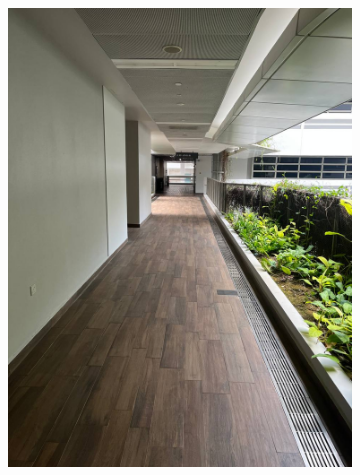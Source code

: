 \documentclass[12pt]{report}
\begin{document}
\begin{figure}[h]
\begin{subfigure}[b]{0.19\textwidth}
        \includegraphics[width=\textwidth]{walking-area-2}
    \end{subfigure}
    \begin{subfigure}[b]{0.19\textwidth}
        \centering

\end{subfigure}
\end{figure}
\end{document}
